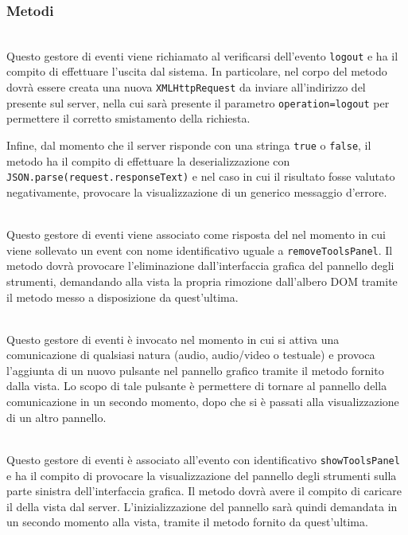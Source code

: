 \subsubsection*{Metodi}
\begin{description}

  \item{}\\
  Questo gestore di eventi viene richiamato al verificarsi dell'evento \verb'logout' e ha il compito di effettuare l'uscita dal sistema. In particolare, nel corpo del metodo dovrà essere creata una nuova \verb'XMLHttpRequest' da inviare all'indirizzo del  presente sul server, nella cui  sarà presente il parametro \verb'operation=logout' per permettere il corretto smistamento della richiesta.
  
  Infine, dal momento che il server risponde con una stringa \verb'true' o \verb'false', il metodo ha il compito di effettuare la deserializzazione con \verb'JSON.parse(request.responseText)' e nel caso in cui il risultato fosse valutato negativamente, provocare la visualizzazione di un generico messaggio d'errore.
  
  \item{}\\
  Questo gestore di eventi viene associato come risposta del  nel momento in cui viene sollevato un event con nome identificativo uguale a \verb'removeToolsPanel'. Il metodo dovrà provocare l'eliminazione dall'interfaccia grafica del pannello degli strumenti, demandando alla vista la propria rimozione dall'albero DOM tramite il metodo  messo a disposizione da quest'ultima.
  
  \item{}\\
  Questo gestore di eventi è invocato nel momento in cui si attiva una comunicazione di qualsiasi natura (audio, audio/video o testuale) e provoca l'aggiunta di un nuovo pulsante nel pannello grafico tramite il metodo  fornito dalla vista. Lo scopo di tale pulsante è permettere di tornare al pannello della comunicazione in un secondo momento, dopo che si è passati alla visualizzazione di un altro pannello.
  
  \item{}\\
  Questo gestore di eventi è associato all'evento con identificativo \texttt{showToolsPanel} e ha il compito di provocare la visualizzazione del pannello degli strumenti sulla parte sinistra dell'interfaccia grafica. Il metodo dovrà avere il compito di caricare il  della vista dal server. L'inizializzazione del pannello sarà quindi demandata in un secondo momento alla vista, tramite il metodo  fornito da quest'ultima.

\end{description}


